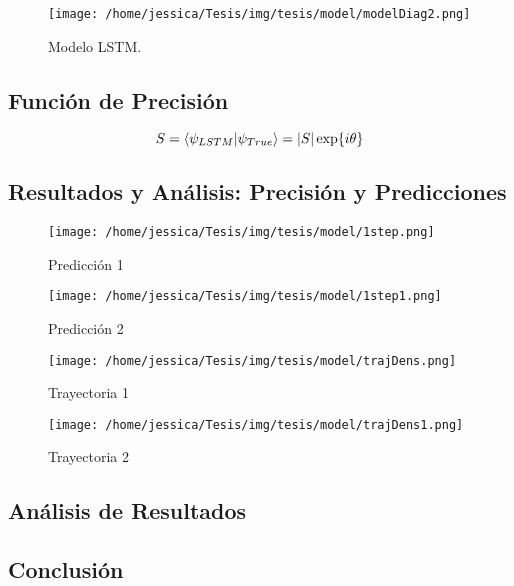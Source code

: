 \begin{figure}[!htbp]
  \centering
  \texttt{[image: /home/jessica/Tesis/img/tesis/model/modelDiag2.png]}
  \caption{Modelo LSTM.}
  \label{fig:Model}
\end{figure}


\subsection{Función de Precisión}

\begin{equation}
  \label{eq:S}
  S = \bra{\psi_{LSTM}}\ket{\psi_{True}} = |S|\exp{i\theta}
\end{equation}



\subsection{Resultados y Análisis: Precisión y Predicciones}\label{sec:Resultados}

\begin{figure}[!htbp]
  \centering
  \texttt{[image: /home/jessica/Tesis/img/tesis/model/1step.png]}
  \caption{Predicción 1}
  \label{fig:1step}
\end{figure}

\begin{figure}[!htbp]
  \centering
  \texttt{[image: /home/jessica/Tesis/img/tesis/model/1step1.png]}
  \caption{Predicción 2}
  \label{fig:1step1}
\end{figure}

\begin{figure}[!htbp]
  \centering
  \texttt{[image: /home/jessica/Tesis/img/tesis/model/trajDens.png]}
  \caption{Trayectoria 1}
  \label{fig:trajec1}
\end{figure}

\begin{figure}[!htbp]
  \centering
  \texttt{[image: /home/jessica/Tesis/img/tesis/model/trajDens1.png]}
  \caption{Trayectoria 2}
  \label{fig:trajec2}
\end{figure}


\subsection{Análisis de Resultados}

\subsection{Conclusión}


